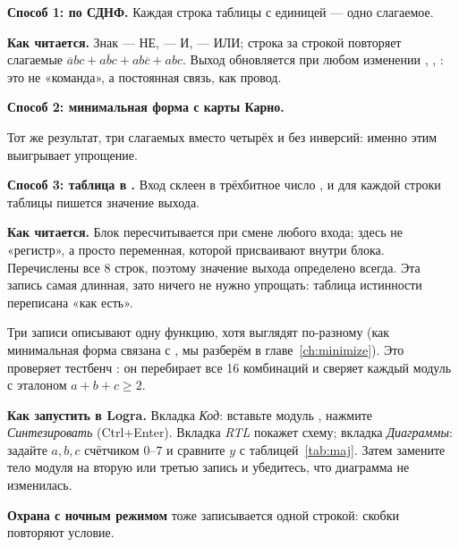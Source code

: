 \textbf{Способ 1: по СДНФ.} Каждая строка таблицы с единицей --- одно
слагаемое.


\textbf{Как читается.} Знак \code{\textasciitilde} --- НЕ, \code{\&} --- И,
\code{|} --- ИЛИ; строка за строкой повторяет слагаемые
$\overline{a}bc+a\overline{b}c+ab\overline{c}+abc$. Выход  обновляется
при любом изменении , , : это не «команда», а
постоянная связь, как провод.

\textbf{Способ 2: минимальная форма с карты Карно.}


Тот же результат, три слагаемых вместо четырёх и без инверсий: именно
этим выигрывает упрощение.

\textbf{Способ 3: таблица в .} Вход склеен в трёхбитное число
, и для каждой строки таблицы пишется значение выхода.


\textbf{Как читается.} Блок  пересчитывается при смене любого
входа;  здесь не «регистр», а просто переменная, которой
присваивают внутри блока. Перечислены все 8 строк, поэтому значение
выхода определено всегда. Эта запись самая длинная, зато ничего не
нужно упрощать: таблица истинности переписана «как есть».

Три записи описывают одну функцию, хотя выглядят по-разному (как
минимальная форма связана с , мы разберём в
главе~\ref{ch:minimize}). Это проверяет тестбенч : он перебирает все 16
комбинаций и сверяет каждый модуль с эталоном $a+b+c\ge2$.


\textbf{Как запустить в Logra.} Вкладка \emph{Код}: вставьте модуль
, нажмите \emph{Синтезировать} (Ctrl+Enter). Вкладка
\emph{RTL} покажет схему; вкладка \emph{Диаграммы}: задайте $a,b,c$ счётчиком
$0$--$7$ и сравните $y$ с таблицей~\ref{tab:maj}. Затем замените тело модуля
на вторую или третью запись и убедитесь, что диаграмма не изменилась.

\textbf{Охрана с ночным режимом} тоже записывается одной строкой:
скобки повторяют условие.


